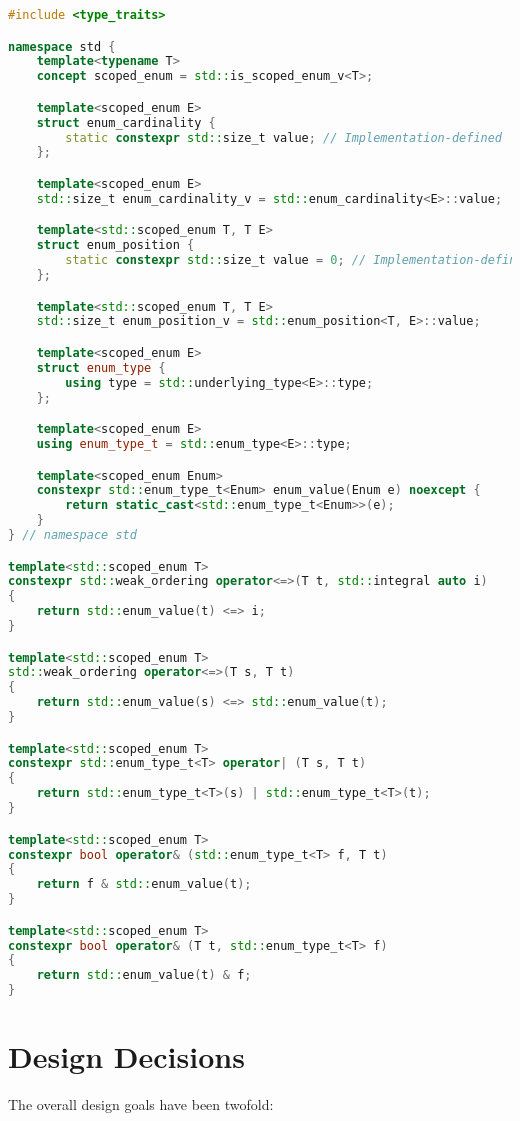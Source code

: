 \documentclass[
  format=manuscript,
  screen=true,
  review=false,
  nonacm=true,
  timestamp=true,
  balance=false]{acmart}
\begin{document}
\begin{lstlisting}[language=Cpp]
#include <type_traits>

namespace std {
    template<typename T>
    concept scoped_enum = std::is_scoped_enum_v<T>;

    template<scoped_enum E>
    struct enum_cardinality {
        static constexpr std::size_t value; // Implementation-defined
    };

    template<scoped_enum E>
    std::size_t enum_cardinality_v = std::enum_cardinality<E>::value;

    template<std::scoped_enum T, T E>
    struct enum_position {
        static constexpr std::size_t value = 0; // Implementation-defined
    };

    template<std::scoped_enum T, T E>
    std::size_t enum_position_v = std::enum_position<T, E>::value;

    template<scoped_enum E>
    struct enum_type {
        using type = std::underlying_type<E>::type;
    };

    template<scoped_enum E>
    using enum_type_t = std::enum_type<E>::type;

    template<scoped_enum Enum>
    constexpr std::enum_type_t<Enum> enum_value(Enum e) noexcept {
        return static_cast<std::enum_type_t<Enum>>(e);
    }
} // namespace std

template<std::scoped_enum T>
constexpr std::weak_ordering operator<=>(T t, std::integral auto i)
{
    return std::enum_value(t) <=> i;
}

template<std::scoped_enum T>
std::weak_ordering operator<=>(T s, T t)
{
    return std::enum_value(s) <=> std::enum_value(t);
}

template<std::scoped_enum T>
constexpr std::enum_type_t<T> operator| (T s, T t)
{
    return std::enum_type_t<T>(s) | std::enum_type_t<T>(t);
}

template<std::scoped_enum T>
constexpr bool operator& (std::enum_type_t<T> f, T t)
{
    return f & std::enum_value(t);
}

template<std::scoped_enum T>
constexpr bool operator& (T t, std::enum_type_t<T> f)
{
    return std::enum_value(t) & f;
}
\end{lstlisting}



\section{Design Decisions}

The overall design goals have been twofold:
\end{document}
